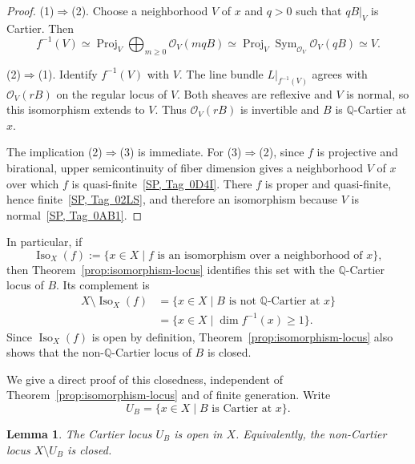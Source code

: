 \documentclass[11pt,a4paper]{article}
\newtheorem{lemma}{Lemma}
\theoremstyle{definition}
\theoremstyle{definition}
\DeclareMathOperator{\Proj}{Proj}
\newcommand{\OO}{\mathcal O}
\begin{document}
\begin{proof}
\textup{(1)}$\Rightarrow$\textup{(2)}. Choose a neighborhood $V$ of $x$ and $q>0$ such that $qB|_V$ is Cartier. Then
\[
 f^{-1}(V)
 \simeq\Proj_V\bigoplus_{m\ge0}\OO_V(mqB)
 \simeq\Proj_V\operatorname{Sym}_{\OO_V}\OO_V(qB)
 \simeq V.
\]

\textup{(2)}$\Rightarrow$\textup{(1)}. Identify $f^{-1}(V)$ with $V$. The line bundle $L|_{f^{-1}(V)}$ agrees with $\OO_V(rB)$ on the regular locus of $V$. Both sheaves are reflexive and $V$ is normal, so this isomorphism extends to $V$. Thus $\OO_V(rB)$ is invertible and $B$ is $\mathbb Q$-Cartier at $x$.

The implication \textup{(2)}$\Rightarrow$\textup{(3)} is immediate. For \textup{(3)}$\Rightarrow$\textup{(2)}, since $f$ is projective and birational, upper semicontinuity of fiber dimension gives a neighborhood $V$ of $x$ over which $f$ is quasi-finite~\href{https://stacks.math.columbia.edu/tag/0D4I}{[SP, Tag~0D4I]}. There $f$ is proper and quasi-finite, hence finite~\href{https://stacks.math.columbia.edu/tag/02LS}{[SP, Tag~02LS]}, and therefore an isomorphism because $V$ is normal~\href{https://stacks.math.columbia.edu/tag/0AB1}{[SP, Tag~0AB1]}.
\end{proof}

In particular, if
\[
 \operatorname{Iso}_X(f)
 :=\{x\in X\mid f\text{ is an isomorphism over a neighborhood of }x\},
\]
then Theorem~\ref{prop:isomorphism-locus} identifies this set with the $\mathbb Q$-Cartier locus of $B$. Its complement is
\[
 \begin{aligned}
 X\setminus\operatorname{Iso}_X(f)
 &=\{x\in X\mid B\text{ is not }\mathbb Q\text{-Cartier at }x\}\\
 &=\{x\in X\mid\dim f^{-1}(x)\ge1\}.
 \end{aligned}
\]
Since $\operatorname{Iso}_X(f)$ is open by definition, Theorem~\ref{prop:isomorphism-locus} also shows that the non-$\mathbb Q$-Cartier locus of $B$ is closed.

We give a direct proof of this closedness, independent of Theorem~\ref{prop:isomorphism-locus} and of finite generation. Write
\[
 U_B=\{x\in X\mid B\text{ is Cartier at }x\}.
\]

\begin{lemma}\label{lem:cartier-locus}
The Cartier locus $U_B$ is open in $X$. Equivalently, the non-Cartier locus $X\setminus U_B$ is closed.
\end{lemma}
\end{document}
